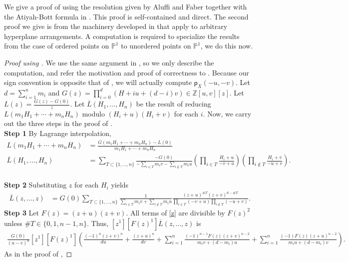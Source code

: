 \documentclass[12 pt, reqno]{amsart}
\theoremstyle{definition}
\newcommand{\mb}{\mathbb}
\newcommand{\p}{\mathsf{p}}
\begin{document}
We give a proof of  using the resolution given by Aluffi
and Faber \cite{AFpoint} together with the Atiyah-Bott formula
\cite{EG98b} in . This proof is self-contained and
direct. The second proof we give is from the machinery developed in
\cite{FML} that apply to arbitrary hyperplane arrangements. A
computation is required to specialize the results from the case of
ordered points on $\mb{P}^1$ to unordered points on $\mb{P}^1$, we do
this now.
\begin{proof}[Proof using \cite{FML}]
We use the same argument in \cite[Theorem 12.5]{FML}, so we only describe the computation, and refer the motivation and proof of correctness to \cite{FML}. Because our sign convention is opposite that of \cite{FML}, we will actually compute $\p_X(-u,-v)$. Let $d=\sum_{i=1}^{n}{m_i}$ and $G(z)=\prod_{i=0}^{d}{(H+iu+(d-i)v)}\in \mathbb{Z}[u,v][z]$. Let $L(z)=\frac{G(z)-G(0)}{z}$. Let $\overline{L}(H_1,\ldots,H_n)$ be the result of reducing $L(m_1H_1+\cdots+m_nH_n)$ modulo $(H_i+u)(H_i+v)$ for each $i$. Now, we carry out the three steps in the proof of \cite[Theorem 12.5]{FML}.\\
  \textbf{Step 1} By Lagrange interpolation,
\begin{align*}
    L(m_1H_1+\cdots+m_nH_n)&=\frac{G(m_1H_1+\cdots+m_nH_n)-L(0)}{m_1H_1+\cdots+m_nH_n}\\
    \overline{L}(H_1,\ldots,H_n)&=\sum_{T\subset \{1,\ldots,n\}}\frac{-G(0)}{-\sum_{i\in T}{m_iv}-\sum_{i\notin T}{m_i u}}\left(\prod_{i\in T}\frac{H_i+u}{-v+u}\right)\left(\prod_{i\notin T}\frac{H_i+v}{-u+v}\right).
\end{align*}\\
\textbf{Step 2} Substituting $z$ for each $H_i$ yields
\begin{align}
    \overline{L}(z,\ldots,z) &= G(0)\sum_{T\subset \{1,\ldots,n\}}\frac{1}{\sum_{i\in T}{m_iv}+\sum_{i\notin T}{m_i u}}\frac{(z+u)^{\# T}(z+v)^{d-\#T}}{\prod_{i\in T}{(-v+u)}\prod_{i\notin T}{(-u+v)}}.\label{z}
\end{align}
\textbf{Step 3} Let $F(z)=(z+u)(z+v)$. All terms of \eqref{z} are
divisible by $F(z)^2$ unless $\# T\in \{0,1,n-1,n\}$. Thus,
$[z^1][F(z)^1]\overline{L}(z,\ldots,z)$ is
\begin{align*} 
\frac{G(0)}{(u-v)^n}[z^1][F(z)^1]\left(\frac{(-1)^n(z+v)^n}{du}+\frac{(z+u)^n}{dv}+\sum_{i=1}^{n}{\frac{(-1)^{n-1}F(z)(z+v)^{n-2}}{m_iv+(d-m_i)u}}+\sum_{i=1}^{n}{\frac{(-1)F(z)(z+u)^{n-2}}{m_iu+(d-m_i)v}}\right). 
\end{align*}
As in the proof of \cite[Theorem 12.5]{FML},

\end{proof}
\end{document}
